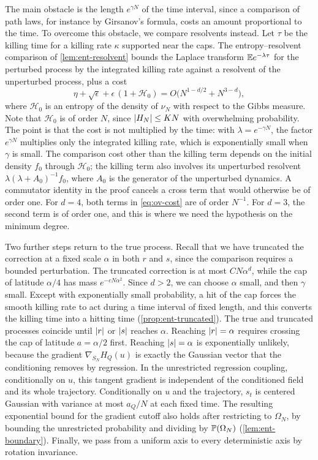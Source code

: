 The main obstacle is the length $e^{\gamma N}$ of the time interval, since a comparison of path laws, for instance by Girsanov's formula, costs an amount proportional to the time. To overcome this obstacle, we compare resolvents instead. Let $\tau$ be the killing time for a killing rate $\kappa$ supported near the caps. The entropy--resolvent comparison of \cref{lem:ent-resolvent} bounds the Laplace transform $\mathbb E e^{-\lambda\tau}$ for the perturbed process by the integrated killing rate against a resolvent of the unperturbed process, plus a cost
\begin{equation}\label{eq:ov-cost}
\eta+\sqrt\epsilon+\epsilon\,(1+\mathcal H_0)=O\bigl(N^{1-d/2}+N^{3-d}\bigr),
\end{equation}
where $\mathcal H_0$ is an entropy of the density of $\nu_N$ with respect to the Gibbs measure. Note that $\mathcal H_0$ is of order $N$, since $\left|H_N\right|\le KN$ with overwhelming probability. The point is that the cost is not multiplied by the time: with $\lambda=e^{-\gamma N}$, the factor $e^{\gamma N}$ multiplies only the integrated killing rate, which is exponentially small when $\gamma$ is small. The comparison cost other than the killing term depends on the initial density $f_0$ through $\mathcal H_0$; the killing term also involves its unperturbed resolvent $\lambda(\lambda+A_0)^{-1}f_0$, where $A_0$ is the generator of the unperturbed dynamics. A commutator identity in the proof cancels a cross term that would otherwise be of order one. For $d=4$, both terms in \eqref{eq:ov-cost} are of order $N^{-1}$. For $d=3$, the second term is of order one, and this is where we need the hypothesis on the minimum degree.

Two further steps return to the true process. Recall that we have truncated the correction at a fixed scale $\alpha$ in both $r$ and $s$, since the comparison requires a bounded perturbation. The truncated correction is at most $CN\alpha^d$, while the cap of latitude $\alpha/4$ has mass $e^{-cN\alpha^2}$. Since $d>2$, we can choose $\alpha$ small, and then $\gamma$ small. Except with exponentially small probability, a hit of the cap forces the smooth killing rate to act during a time interval of fixed length, and this converts the killing time into a hitting time (\cref{prop:ent-truncated}). The true and truncated processes coincide until $\left|r\right|$ or $\left|s\right|$ reaches $\alpha$. Reaching $\left|r\right|=\alpha$ requires crossing the cap of latitude $a=\alpha/2$ first. Reaching $\left|s\right|=\alpha$ is exponentially unlikely, because the gradient $\nabla_{S_N}H_Q(u)$ is exactly the Gaussian vector that the conditioning removes by regression. In the unrestricted regression coupling, conditionally on $u$, this tangent gradient is independent of the conditioned field and its whole trajectory. Conditionally on $u$ and the trajectory, $s_t$ is centered Gaussian with variance at most $a_Q/N$ at each fixed time. The resulting exponential bound for the gradient cutoff also holds after restricting to $\Omega_N$, by bounding the unrestricted probability and dividing by $\mathbb P(\Omega_N)$ (\cref{lem:ent-boundary}). Finally, we pass from a uniform axis to every deterministic axis by rotation invariance.

